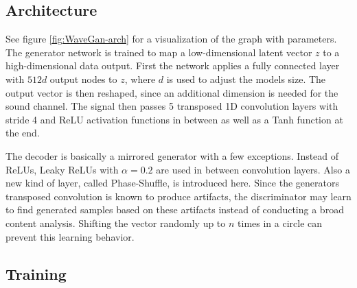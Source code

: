 \documentclass[12pt]{article}
\begin{document}
\subsection{Architecture}
See figure \ref{fig:WaveGan-arch} for a visualization of the graph with parameters.
The generator network is trained to map a low-dimensional latent vector $z$ to a high-dimensional data output.
First the network applies a fully connected layer with $512d$ output nodes to $z$, where $d$ is used to adjust the models size.
The output vector is then reshaped, since an additional dimension is needed for the sound channel.
The signal then passes 5 transposed 1D convolution layers with stride 4 and ReLU activation functions in between as well as a Tanh function at the end.

The decoder is basically a mirrored generator with a few exceptions.
Instead of ReLUs, Leaky ReLUs with $\alpha=0.2$ are used in between convolution layers.
Also a new kind of layer, called Phase-Shuffle, is introduced here. 
Since the generators transposed convolution is known to produce artifacts, the discriminator may learn to find generated samples based on these artifacts instead of conducting a broad content analysis.
Shifting the vector randomly up to $n$ times in a circle can prevent this learning behavior.





\subsection{Training}
\end{document}
